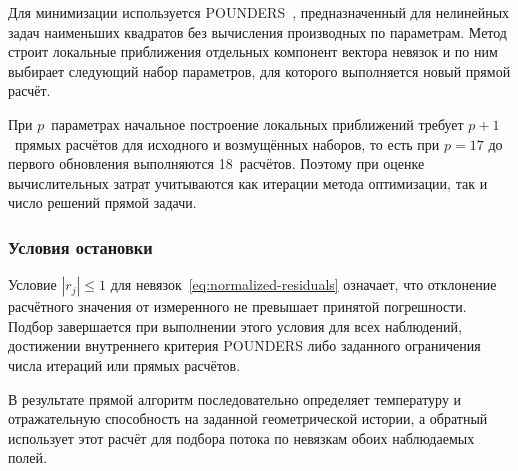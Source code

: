 Для минимизации используется POUNDERS~\cite{wild2017,petscManual}, предназначенный для нелинейных задач наименьших квадратов без вычисления производных по параметрам. Метод строит локальные приближения отдельных компонент вектора невязок и по ним выбирает следующий набор параметров, для которого выполняется новый прямой расчёт.

При $p$~параметрах начальное построение локальных приближений требует $p+1$~прямых расчётов для исходного и возмущённых наборов, то есть при $p=17$ до первого обновления выполняются 18~расчётов. Поэтому при оценке вычислительных затрат учитываются как итерации метода оптимизации, так и число решений прямой задачи.

\subsubsection{Условия остановки}

Условие $|r_j|\leq1$ для невязок~\eqref{eq:normalized-residuals} означает, что отклонение расчётного значения от измеренного не превышает принятой погрешности. Подбор завершается при выполнении этого условия для всех наблюдений, достижении внутреннего критерия POUNDERS либо заданного ограничения числа итераций или прямых расчётов.

В результате прямой алгоритм последовательно определяет температуру и отражательную способность на заданной геометрической истории, а обратный использует этот расчёт для подбора потока по невязкам обоих наблюдаемых полей.
